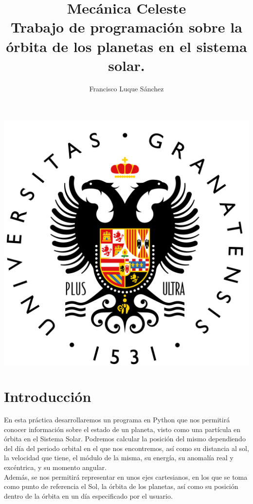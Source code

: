 \documentclass[12pt]{article}
\title{
  Mecánica Celeste\\
  \large Trabajo de programación sobre la 
  órbita de los planetas en el sistema solar.  }
\author{ 
  Francisco Luque Sánchez
}
\begin{document}
\maketitle
\begin{center}  
\includegraphics[scale=0.35]{escudo.png}
\end{center}

\newpage

\tableofcontents %

\pagebreak

\section{Introducción}

En esta práctica desarrollaremos un programa en Python que nos
permitirá conocer información sobre el estado de un planeta, visto
como una partícula en órbita en el Sistema Solar. Podremos calcular la
posición del mismo dependiendo del día del periodo orbital en el que
nos encontremos, así como su distancia al sol, la velocidad que tiene,
el módulo de la misma, su energía, su anomalía real y excéntrica, y su
momento angular.\\

Además, se nos permitirá representar en unos ejes cartesianos, en los
que se toma como punto de referencia el Sol, la órbita de los
planetas, así como su posición dentro de la órbita en un día
especificado por el usuario.\\
\end{document}
